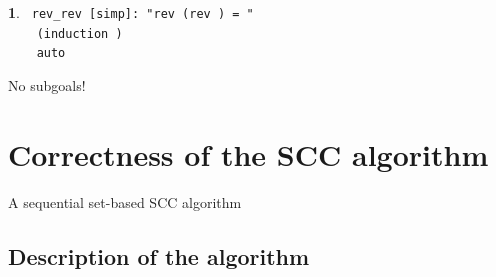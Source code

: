 \documentclass{beamer}
\newcommand{\apply}{{\color{isa_red}{apply}}}
\newcommand{\thm}{{\color{isa_blue}{theorem}}}
\newcommand{\isa}[1]{\texttt{#1}}
\newcommand{\blue}[1]{{\color{isa_dark_blue}{#1}}}
\theoremstyle{definition}
\newtheorem*{isabelle}{}
\begin{document}
\begin{frame}
  \begin{isabelle}
    \isa{
      \thm{} rev\_rev [simp]: "rev (rev \blue{x}) = \blue{x}"\\
      ~~~\apply{} (induction \blue{x})\\
      ~~~\apply{} auto\\
    }
  \end{isabelle}
  No subgoals!
\end{frame}

\section[Correctness]{Correctness of the SCC algorithm}
\begin{frame}
  \centering
  A sequential set-based SCC algorithm
\end{frame}

\subsection{Description of the algorithm}
\end{document}
